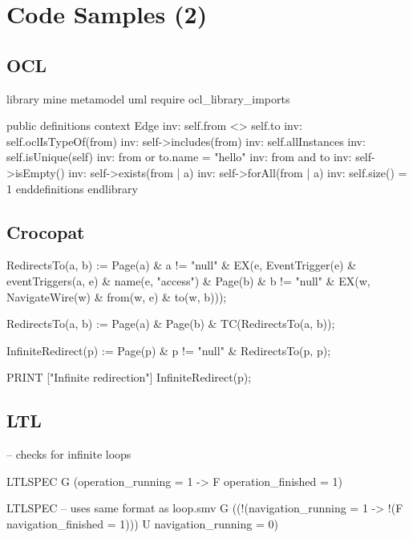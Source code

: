 \chapter{Code Samples (2)}

\section{OCL}

\begin{oclcode}
library mine
	metamodel uml
	require ocl_library_imports
	
	public definitions
	context Edge
	  inv: self.from <> self.to
	  inv: self.oclIsTypeOf(from)
	  inv: self->includes(from)
	  inv: self.allInstances
	  inv: self.isUnique(self)
	  inv: from or to.name = "hello"
	  inv: from and to
	  inv: self->isEmpty()
	  inv: self->exists(from | a)
	  inv: self->forAll(from | a)
	  inv: self.size() = 1
	enddefinitions
endlibrary
\end{oclcode}

\section{Crocopat}

\begin{crocopatcode}
RedirectsTo(a, b) :=
  Page(a) & a != "null" &
  EX(e, EventTrigger(e) &
  eventTriggers(a, e) &
  name(e, "access") &
  Page(b) & b != "null" &
  EX(w, NavigateWire(w) & from(w, e) & to(w, b)));

RedirectsTo(a, b) :=
  Page(a) & Page(b) & TC(RedirectsTo(a, b));

InfiniteRedirect(p) := 
  Page(p) & p != "null" &
  RedirectsTo(p, p);
  
PRINT ["Infinite redirection"] InfiniteRedirect(p);
\end{crocopatcode}

\section{LTL}

\begin{ltlcode}
-- checks for infinite loops

LTLSPEC
  G (operation_running = 1 -> F operation_finished = 1) 
  
LTLSPEC
  -- uses same format as loop.smv
  G ((!(navigation_running = 1 -> !(F navigation_finished = 1))) U navigation_running = 0)
\end{ltlcode}
